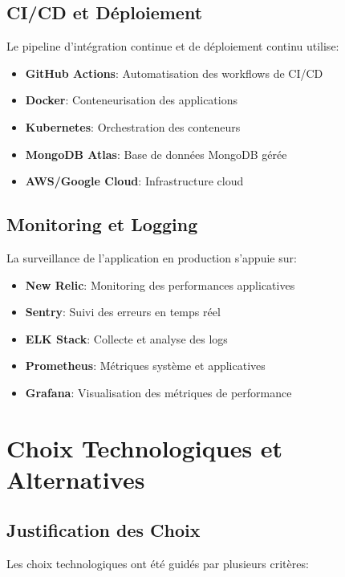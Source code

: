 \subsection{CI/CD et Déploiement}

Le pipeline d'intégration continue et de déploiement continu utilise:

\begin{itemize}
    \item \textbf{GitHub Actions}: Automatisation des workflows de CI/CD
    \item \textbf{Docker}: Conteneurisation des applications
    \item \textbf{Kubernetes}: Orchestration des conteneurs
    \item \textbf{MongoDB Atlas}: Base de données MongoDB gérée
    \item \textbf{AWS/Google Cloud}: Infrastructure cloud
\end{itemize}

\subsection{Monitoring et Logging}

La surveillance de l'application en production s'appuie sur:

\begin{itemize}
    \item \textbf{New Relic}: Monitoring des performances applicatives
    \item \textbf{Sentry}: Suivi des erreurs en temps réel
    \item \textbf{ELK Stack}: Collecte et analyse des logs
    \item \textbf{Prometheus}: Métriques système et applicatives
    \item \textbf{Grafana}: Visualisation des métriques de performance
\end{itemize}

\section{Choix Technologiques et Alternatives}

\subsection{Justification des Choix}

Les choix technologiques ont été guidés par plusieurs critères:

